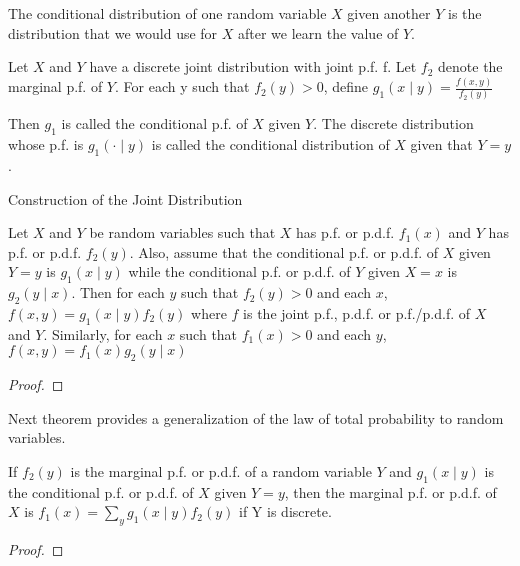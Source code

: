 {\color{red} The conditional distribution of one random variable $X$ given another $Y$ is the distribution that we would use for $X$ after we learn the value of $Y$.}

\begin{definition}
Let $X$ and $Y$ have a discrete joint distribution with joint p.f. f. Let $f_{2}$ denote the marginal p.f. of $Y$. For each y such that $f_{2}\left(y\right)>0$, define $g_{1}\left(x\mid y\right)=\frac{f\left(x,y\right)}{f_{2}\left(y\right)}$
\end{definition}

{\color{red} Then $g_{1}$ is called the conditional p.f. of $X$ given $Y$. The discrete distribution whose p.f. is $g_{1}\left(\cdot\mid y\right)$ is called the conditional distribution of $X$ given that $Y=y$.}

{\color{red} Construction of the Joint Distribution}

\begin{proposition}
Let $X$ and $Y$ be random variables such that $X$ has p.f. or p.d.f. $f_{1}\left(x\right)$ and $Y$ has p.f. or p.d.f. $f_{2}\left(y\right)$. Also, assume that the conditional p.f. or p.d.f. of $X$ given $Y=y$ is $g_{1}\left(x\mid y\right)$ while the conditional p.f. or p.d.f. of $Y$ given $X=x$ is $g_{2}\left(y\mid x\right)$. Then for each $y$ such that $f_{2}\left(y\right)>0$ and each $x$, $f\left(x,y\right)=g_{1}\left(x\mid y\right)f_{2}\left(y\right)$ where $f$ is the joint p.f., p.d.f. or p.f./p.d.f. of $X$ and $Y$. Similarly, for each $x$ such that $f_{1}\left(x\right)>0$ and each $y$, $f\left(x,y\right)=f_{1}\left(x\right)g_{2}\left(y\mid x\right)$
\end{proposition}
\begin{proof}
\end{proof}

{\color{red} Next theorem provides a generalization of the law of total probability to random variables.}

\begin{proposition}
If $f_{2}\left(y\right)$ is the marginal p.f. or p.d.f. of a random variable $Y$ and $g_{1}\left(x\mid y\right)$ is the conditional p.f. or p.d.f. of $X$ given $Y=y$, then the marginal p.f. or p.d.f. of $X$ is $f_{1}\left(x\right)=\sum_{y}g_{\text{1}}\left(x\mid y\right)f_{2}\left(y\right)$
if Y is discrete.
\end{proposition}
\begin{proof}
\end{proof}

